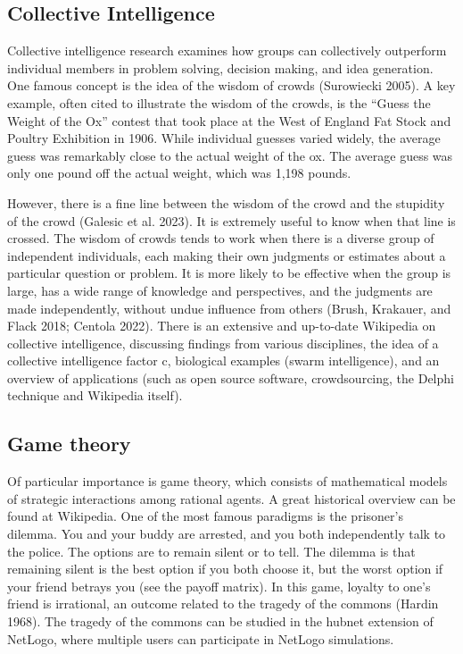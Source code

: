 \documentclass[
  letterpaper,
]{scrbook}
\begin{document}
\hypertarget{collective-intelligence}{%
\subsection{Collective Intelligence}\label{collective-intelligence}}

Collective intelligence research examines how groups can collectively
outperform individual members in problem solving, decision making, and
idea generation. One famous concept is the idea of the wisdom of crowds
(Surowiecki 2005). A key example, often cited to illustrate the wisdom
of the crowds, is the ``Guess the Weight of the Ox'' contest that took
place at the West of England Fat Stock and Poultry Exhibition in 1906.
While individual guesses varied widely, the average guess was remarkably
close to the actual weight of the ox. The average guess was only one
pound off the actual weight, which was 1,198 pounds.

However, there is a fine line between the wisdom of the crowd and the
stupidity of the crowd (Galesic et al. 2023). It is extremely useful to
know when that line is crossed. The wisdom of crowds tends to work when
there is a diverse group of independent individuals, each making their
own judgments or estimates about a particular question or problem. It is
more likely to be effective when the group is large, has a wide range of
knowledge and perspectives, and the judgments are made independently,
without undue influence from others (Brush, Krakauer, and Flack 2018;
Centola 2022). There is an extensive and up-to-date Wikipedia on
collective intelligence, discussing findings from various disciplines,
the idea of a collective intelligence factor c, biological examples
(swarm intelligence), and an overview of applications (such as open
source software, crowdsourcing, the Delphi technique and Wikipedia
itself).

\hypertarget{game-theory}{%
\subsection{Game theory}\label{game-theory}}

Of particular importance is game theory, which consists of mathematical
models of strategic interactions among rational agents. A great
historical overview can be found at Wikipedia. One of the most famous
paradigms is the prisoner's dilemma. You and your buddy are arrested,
and you both independently talk to the police. The options are to remain
silent or to tell. The dilemma is that remaining silent is the best
option if you both choose it, but the worst option if your friend
betrays you (see the payoff matrix). In this game, loyalty to one's
friend is irrational, an outcome related to the tragedy of the commons
(Hardin 1968). The tragedy of the commons can be studied in the hubnet
extension of NetLogo, where multiple users can participate in NetLogo
simulations.
\end{document}
